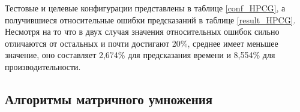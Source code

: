 		Тестовые и целевые конфигурации представлены в таблице \eqref{conf_HPCG}, а получившиеся относительные ошибки предсказаний в таблице \eqref{result_HPCG}. Несмотря на то что в двух случая значения относительных ошибок сильно отличаются от остальных и почти достигают 20\%, среднее имеет меньшее значение, оно составляет 2,674\% для предсказания времени и 8,554\% для производительности.

	\subsection{Алгоритмы матричного умножения}
